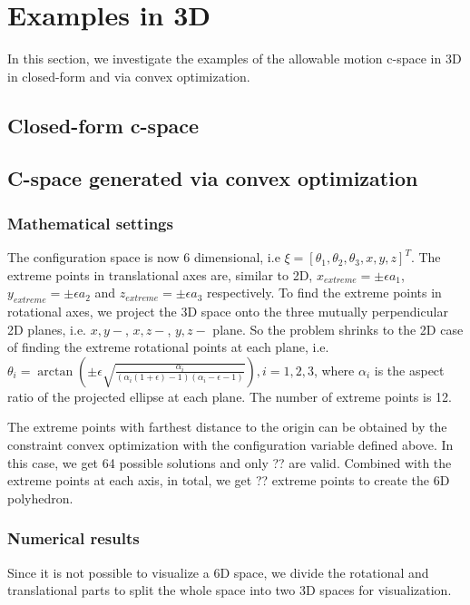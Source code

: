 \documentclass{article}
\begin{document}
\section{Examples in 3D}
In this section, we investigate the examples of the allowable motion c-space in 3D in closed-form and via convex optimization.

\subsection{Closed-form c-space}
\subsection{C-space generated via convex optimization}
\subsubsection{Mathematical settings}
The configuration space is now 6 dimensional, i.e $\xi = [\theta_1,\theta_2,\theta_3,x,y,z]^T$. The extreme points in translational axes are, similar to 2D, $x_{extreme} = \pm \epsilon a_1$, $y_{extreme} = \pm \epsilon a_2$ and $z_{extreme} = \pm \epsilon a_3$ respectively. To find the extreme points in rotational axes, we project the 3D space onto the three mutually perpendicular 2D planes, i.e. $x,y-$, $x,z-$, $y,z-$ plane. So the problem shrinks to the 2D case of finding the extreme rotational points at each plane, i.e. $\theta_i = \arctan(\pm \epsilon \sqrt{\frac{\alpha_i}{(\alpha_i(1+\epsilon)-1) (\alpha_i - \epsilon - 1)}}), i = 1,2,3$, where $\alpha_i$ is the aspect ratio of the projected ellipse at each plane. The number of extreme points is 12.

The extreme points with farthest distance to the origin can be obtained by the constraint convex optimization with the configuration variable defined above. In this case, we get 64 possible solutions and only ?? are valid. Combined with the extreme points at each axis, in total, we get ?? extreme points to create the 6D polyhedron.

\subsubsection{Numerical results}
Since it is not possible to visualize a 6D space, we divide the rotational and translational parts to split the whole space into two 3D spaces for visualization.



\appendix
\end{document}
